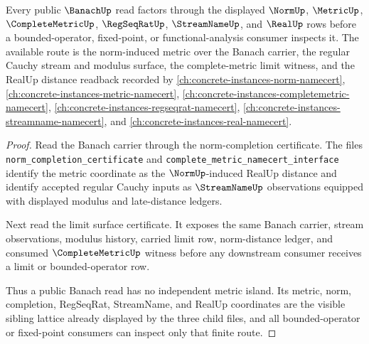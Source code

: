 \begin{theorem}
\label{thm:banach-metric-norm-completion-sibling-lattice}
Every public $\BanachUp$ read factors through the displayed $\NormUp$,
$\MetricUp$, $\CompleteMetricUp$, $\RegSeqRatUp$, $\StreamNameUp$, and
$\RealUp$ rows before a bounded-operator, fixed-point, or
functional-analysis consumer inspects it. The available route is the
norm-induced metric over the Banach carrier, the regular Cauchy stream and
modulus surface, the complete-metric limit witness, and the RealUp distance
readback recorded by \autoref{ch:concrete-instances-norm-namecert},
\autoref{ch:concrete-instances-metric-namecert},
\autoref{ch:concrete-instances-completemetric-namecert},
\autoref{ch:concrete-instances-regseqrat-namecert},
\autoref{ch:concrete-instances-streamname-namecert}, and
\autoref{ch:concrete-instances-real-namecert}.
\end{theorem}
\begin{proof}
Read the Banach carrier through the norm-completion certificate. The files
\texttt{norm\_completion\_certificate} and
\texttt{complete\_metric\_namecert\_interface} identify the metric coordinate
as the $\NormUp$-induced RealUp distance and identify accepted regular Cauchy
inputs as $\StreamNameUp$ observations equipped with displayed modulus and
late-distance ledgers.

Next read the limit surface certificate. It exposes the same Banach carrier,
stream observations, modulus history, carried limit row, norm-distance ledger,
and consumed $\CompleteMetricUp$ witness before any downstream consumer receives
a limit or bounded-operator row.

Thus a public Banach read has no independent metric island. Its metric,
norm, completion, RegSeqRat, StreamName, and RealUp coordinates are the
visible sibling lattice already displayed by the three child files, and all
bounded-operator or fixed-point consumers can inspect only that finite route.
\end{proof}
